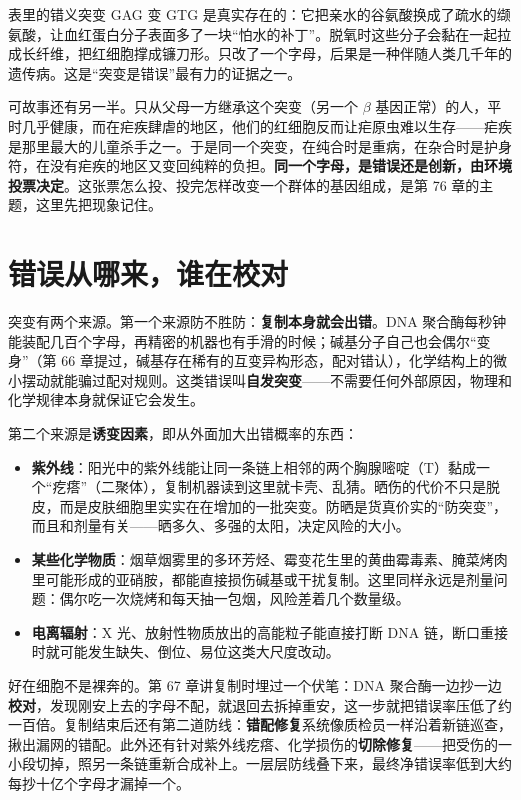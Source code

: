 表里的错义突变 GAG 变 GTG 是真实存在的：它把亲水的谷氨酸换成了疏水的缬氨酸，让血红蛋白分子表面多了一块“怕水的补丁”。脱氧时这些分子会黏在一起拉成长纤维，把红细胞撑成镰刀形。只改了一个字母，后果是一种伴随人类几千年的遗传病。这是“突变是错误”最有力的证据之一。

可故事还有另一半。只从父母一方继承这个突变（另一个 \(\beta\) 基因正常）的人，平时几乎健康，而在疟疾肆虐的地区，他们的红细胞反而让疟原虫难以生存——疟疾是那里最大的儿童杀手之一。于是同一个突变，在纯合时是重病，在杂合时是护身符，在没有疟疾的地区又变回纯粹的负担。\textbf{同一个字母，是错误还是创新，由环境投票决定}。这张票怎么投、投完怎样改变一个群体的基因组成，是第 76 章的主题，这里先把现象记住。

\section{错误从哪来，谁在校对}

突变有两个来源。第一个来源防不胜防：\textbf{复制本身就会出错}。DNA 聚合酶每秒钟能装配几百个字母，再精密的机器也有手滑的时候；碱基分子自己也会偶尔“变身”（第 66 章提过，碱基存在稀有的互变异构形态，配对错认），化学结构上的微小摆动就能骗过配对规则。这类错误叫\textbf{自发突变}——不需要任何外部原因，物理和化学规律本身就保证它会发生。

第二个来源是\textbf{诱变因素}，即从外面加大出错概率的东西：

\begin{itemize}[itemsep=2pt]
\item \textbf{紫外线}：阳光中的紫外线能让同一条链上相邻的两个胸腺嘧啶（T）黏成一个“疙瘩”（二聚体），复制机器读到这里就卡壳、乱猜。晒伤的代价不只是脱皮，而是皮肤细胞里实实在在增加的一批突变。防晒是货真价实的“防突变”，而且和剂量有关——晒多久、多强的太阳，决定风险的大小。
\item \textbf{某些化学物质}：烟草烟雾里的多环芳烃、霉变花生里的黄曲霉毒素、腌菜烤肉里可能形成的亚硝胺，都能直接损伤碱基或干扰复制。这里同样永远是剂量问题：偶尔吃一次烧烤和每天抽一包烟，风险差着几个数量级。
\item \textbf{电离辐射}：X 光、放射性物质放出的高能粒子能直接打断 DNA 链，断口重接时就可能发生缺失、倒位、易位这类大尺度改动。
\end{itemize}

好在细胞不是裸奔的。第 67 章讲复制时埋过一个伏笔：DNA 聚合酶一边抄一边\textbf{校对}，发现刚安上去的字母不配，就退回去拆掉重安，这一步就把错误率压低了约一百倍。复制结束后还有第二道防线：\textbf{错配修复}系统像质检员一样沿着新链巡查，揪出漏网的错配。此外还有针对紫外线疙瘩、化学损伤的\textbf{切除修复}——把受伤的一小段切掉，照另一条链重新合成补上。一层层防线叠下来，最终净错误率低到大约每抄十亿个字母才漏掉一个。

